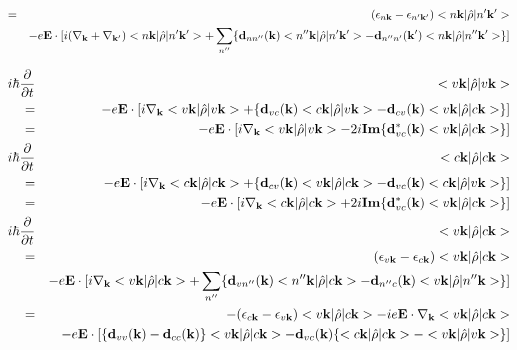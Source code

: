 \documentclass[aps,prb,preprint]{revtex4-1}
\begin{document}
\begin{appendix}
\begin{eqnarray}
= && (\epsilon_{n{\bf k}}-\epsilon_{n'{\bf k'}}) <n{\bf k}| \hat{\rho} |n'{\bf k'}> \nonumber  \\
&&-e{\bf E} \cdot [  i ( \nabla_{\bf k} + \nabla_{\bf k'} ) <n{\bf k}|\hat{\rho}|n'{\bf k'}> + \sum_{n''}\{ {\bf d}_{nn''}({\bf k})<n''{\bf k}|\hat{\rho}|n'{\bf k'}> - {\bf d}_{n''n'}({\bf k'})<n{\bf k}|\hat{\rho}|n''{\bf k'}> \} ] \nonumber  \\
\end{eqnarray}

 \begin{eqnarray}
i \hbar \frac{ \partial }{\partial t } &&<v{\bf k}| \hat{\rho} |v{\bf k}> \nonumber \\
= && -e{\bf E} \cdot [  i \nabla_{\bf k} <v{\bf k}|\hat{\rho}|v{\bf k}> + \{ {\bf d}_{vc}({\bf k})<c{\bf k}|\hat{\rho}|v{\bf k}> - {\bf d}_{cv}({\bf k})<v{\bf k}|\hat{\rho}|c{\bf k}> \} ] \nonumber  \\
= && -e{\bf E} \cdot[  i \nabla_{\bf k} <v{\bf k}|\hat{\rho}|v{\bf k}> - 2i {\bf Im}\{ {\bf d}_{vc}^*({\bf k})<v{\bf k}|\hat{\rho}|c{\bf k}> \} ] \\
%
i \hbar \frac{ \partial }{\partial t } &&<c{\bf k}| \hat{\rho} |c{\bf k}> \nonumber \\
=&& -e{\bf E} \cdot [ i \nabla_{\bf k} <c{\bf k}|\hat{\rho}|c{\bf k}> + \{ {\bf d}_{cv}({\bf k})<v{\bf k}|\hat{\rho}|c{\bf k}> - {\bf d}_{vc}({\bf k})<c{\bf k}|\hat{\rho}|v{\bf k}> \} ] \nonumber  \\
=&& -e{\bf E} \cdot [ i \nabla_{\bf k} <c{\bf k}|\hat{\rho}|c{\bf k}> + 2i {\bf Im}\{ {\bf d}_{vc}^*({\bf k})<v{\bf k}|\hat{\rho}|c{\bf k}> \} ] \\
%
i \hbar \frac{ \partial }{\partial t } &&<v{\bf k}| \hat{\rho} |c{\bf k}> \nonumber \\
= && (\epsilon_{v{\bf k}}-\epsilon_{c{\bf k}}) <v{\bf k}| \hat{\rho} |c{\bf k}> \nonumber  \\
&&-e{\bf E} \cdot [  i \nabla_{\bf k} <v{\bf k}|\hat{\rho}|c{\bf k}>  + \sum_{n''}\{ {\bf d}_{vn''}({\bf k})<n''{\bf k}|\hat{\rho}|c{\bf k}> - {\bf d}_{n''c}({\bf k})<v{\bf k}|\hat{\rho}|n''{\bf k}> \} ]\nonumber  \\
= && - (\epsilon_{c{\bf k}}-\epsilon_{v{\bf k}}) <v{\bf k}| \hat{\rho} |c{\bf k}>  - i e{\bf E} \cdot \nabla_{\bf k} <v{\bf k}|\hat{\rho}|c{\bf k}> \nonumber  \\
&&-e{\bf E} \cdot [ \{ {\bf d}_{vv}({\bf k})-{\bf d}_{cc}({\bf k}) \} <v{\bf k}|\hat{\rho}|c{\bf k}> - {\bf d}_{vc}({\bf k}) \{ <c{\bf k}|\hat{\rho}|c{\bf k}> - <v{\bf k}|\hat{\rho}|v{\bf k}>  \} ] 
\end{eqnarray}


\end{appendix}
\end{document}

